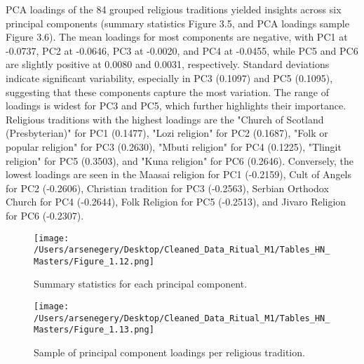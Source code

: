 \documentclass[12pt]{report}
\begin{document}
	\noindent PCA loadings of the 84 grouped religious traditions yielded insights across six principal components (summary statistics Figure 3.5, and PCA loadings sample Figure 3.6). The mean loadings for most components are negative, with PC1 at -0.0737, PC2 at -0.0646, PC3 at -0.0020, and PC4 at -0.0455, while PC5 and PC6 are slightly positive at 0.0080 and 0.0031, respectively. Standard deviations indicate significant variability, especially in PC3 (0.1097) and PC5 (0.1095), suggesting that these components capture the most variation. The range of loadings is widest for PC3 and PC5, which further highlights their importance. Religious traditions with the highest loadings are the "Church of Scotland (Presbyterian)" for PC1 (0.1477), "Lozi religion" for PC2 (0.1687), "Folk or popular religion" for PC3 (0.2630), "Mbuti religion" for PC4 (0.1225), "Tlingit religion" for PC5 (0.3503), and "Kuna religion" for PC6 (0.2646). Conversely, the lowest loadings are seen in the Maasai religion for PC1 (-0.2159), Cult of Angels for PC2 (-0.2606), Christian tradition for PC3 (-0.2563), Serbian Orthodox Church for PC4 (-0.2644), Folk Religion for PC5 (-0.2513), and Jivaro Religion for PC6 (-0.2307).\\
	
	\begin{figure}[htbp]
		\centering
		\texttt{[image: /Users/arsenegery/Desktop/Cleaned\_Data\_Ritual\_M1/Tables\_HN\_Masters/Figure\_1.12.png]} %
		\caption{Summary statistics for each principal component.} 
		\label{fig:table12}
	\end{figure}
	
	\begin{figure}[htbp]
		\centering
		\texttt{[image: /Users/arsenegery/Desktop/Cleaned\_Data\_Ritual\_M1/Tables\_HN\_Masters/Figure\_1.13.png]} %
		\caption{Sample of principal component loadings per religious tradition.} 
		\label{fig:table13}
	\end{figure}
	
\end{document}
